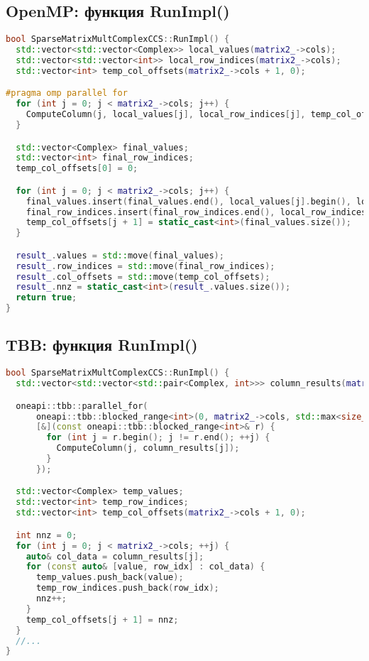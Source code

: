 \documentclass[12pt]{extarticle}
\begin{document}
\subsection*{OpenMP: функция RunImpl()}
\begin{lstlisting}[language=C++]
bool SparseMatrixMultComplexCCS::RunImpl() {
  std::vector<std::vector<Complex>> local_values(matrix2_->cols);
  std::vector<std::vector<int>> local_row_indices(matrix2_->cols);
  std::vector<int> temp_col_offsets(matrix2_->cols + 1, 0);

#pragma omp parallel for
  for (int j = 0; j < matrix2_->cols; j++) {
    ComputeColumn(j, local_values[j], local_row_indices[j], temp_col_offsets);
  }

  std::vector<Complex> final_values;
  std::vector<int> final_row_indices;
  temp_col_offsets[0] = 0;

  for (int j = 0; j < matrix2_->cols; j++) {
    final_values.insert(final_values.end(), local_values[j].begin(), local_values[j].end());
    final_row_indices.insert(final_row_indices.end(), local_row_indices[j].begin(), local_row_indices[j].end());
    temp_col_offsets[j + 1] = static_cast<int>(final_values.size());
  }

  result_.values = std::move(final_values);
  result_.row_indices = std::move(final_row_indices);
  result_.col_offsets = std::move(temp_col_offsets);
  result_.nnz = static_cast<int>(result_.values.size());
  return true;
}
\end{lstlisting}

\subsection*{TBB: функция RunImpl()}
\begin{lstlisting}[language=C++]
bool SparseMatrixMultComplexCCS::RunImpl() {
  std::vector<std::vector<std::pair<Complex, int>>> column_results(matrix2_->cols);

  oneapi::tbb::parallel_for(
      oneapi::tbb::blocked_range<int>(0, matrix2_->cols, std::max<size_t>(16, matrix2_->cols / 16)),
      [&](const oneapi::tbb::blocked_range<int>& r) {
        for (int j = r.begin(); j != r.end(); ++j) {
          ComputeColumn(j, column_results[j]);
        }
      });

  std::vector<Complex> temp_values;
  std::vector<int> temp_row_indices;
  std::vector<int> temp_col_offsets(matrix2_->cols + 1, 0);

  int nnz = 0;
  for (int j = 0; j < matrix2_->cols; ++j) {
    auto& col_data = column_results[j];
    for (const auto& [value, row_idx] : col_data) {
      temp_values.push_back(value);
      temp_row_indices.push_back(row_idx);
      nnz++;
    }
    temp_col_offsets[j + 1] = nnz;
  }
  //...
}
\end{lstlisting}
\end{document}
